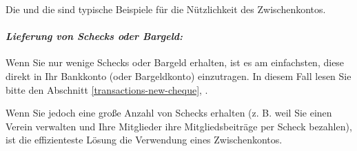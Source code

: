 Die  und die  sind typische Beispiele für die Nützlichkeit des Zwischenkontos.

\paragraph{\textsl{Lieferung von Schecks oder Bargeld:}\label{accounts-type-bank-waiting-remittance}}

Wenn Sie nur wenige Schecks oder Bargeld erhalten, ist es am einfachsten, diese direkt in Ihr Bankkonto (oder Bargeldkonto) einzutragen. In diesem Fall lesen Sie bitte den Abschnitt \vref{transactions-new-cheque}, .

Wenn Sie jedoch eine große Anzahl von Schecks erhalten (z. B. weil Sie einen Verein verwalten und Ihre Mitglieder ihre Mitgliedsbeiträge per Scheck bezahlen), ist die effizienteste Lösung die Verwendung eines Zwischenkontos.


